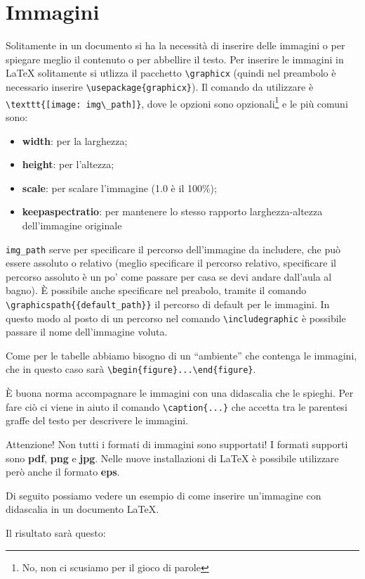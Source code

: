 \section{Immagini}
Solitamente in un documento si ha la necessità di inserire delle immagini o 
per spiegare meglio il contenuto o per abbellire il testo. Per inserire le 
immagini in \LaTeX{} solitamente si utlizza il pacchetto \verb!\graphicx! 
(quindi nel preambolo è necessario inserire \verb!\usepackage{graphicx}!). Il 
comando da utilizzare è \verb!\texttt{[image: img\_path]}!, dove le 
opzioni sono opzionali\footnote{No, non ci scusiamo per il gioco di parole} e 
le più comuni sono:
\begin{itemize}
    \item \textbf{width}: per la larghezza;
    \item \textbf{height}: per l'altezza;
    \item \textbf{scale}: per scalare l'immagine (1.0 è il 100\%);
    \item \textbf{keepaspectratio}: per mantenere lo stesso rapporto 
    larghezza-altezza dell’immagine originale
\end{itemize}
\verb!img_path! serve per specificare il percorso dell'immagine da includere, 
che può essere assoluto o relativo (meglio specificare il percorso relativo, 
specificare il percorso assoluto è un po' come passare per casa se devi andare 
dall'aula al bagno). È possibile anche specificare nel preabolo, tramite il 
comando \verb!\graphicspath{{default_path}}! il percorso di default per le 
immagini. In questo modo al posto di un percorso nel comando 
\verb!\includegraphic! è possibile passare il nome dell'immagine voluta.

Come per le tabelle abbiamo bisogno di un ``ambiente'' che contenga le 
immagini, che in questo caso sarà \verb!\begin{figure}...\end{figure}!.

È buona norma accompagnare le immagini con una didascalia che le spieghi. Per 
fare ciò ci viene in aiuto il comando \verb!\caption{...}! che accetta tra le 
parentesi graffe del testo per descrivere le immagini.

Attenzione! Non tutti i formati di immagini sono supportati! I formati 
supporti sono \textbf{pdf}, \textbf{png} e \textbf{jpg}. Nelle nuove 
installazioni di \LaTeX{} è possibile utilizzare però anche il formato \textbf{
eps}.

Di seguito possiamo vedere un esempio di come inserire un'immagine con 
didascalia in un documento \LaTeX{}.

Il risultato sarà questo:


